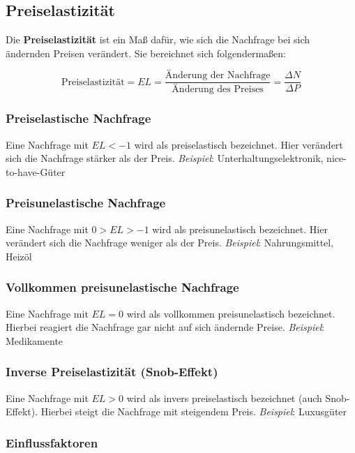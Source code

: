 \documentclass[titlepage,parskip=half]{scrartcl}
\begin{document}
\subsection{Preiselastizität}
Die \textbf{Preiselastizität} ist ein Maß dafür, wie sich die Nachfrage bei sich ändernden Preisen verändert. Sie bereichnet sich folgendermaßen:

$$
\textrm{Preiselastizität} = EL = \frac{\textrm{Änderung der Nachfrage}}{\textrm{Änderung des Preises}} = \frac{\Delta N}{\Delta P}
$$

\subsubsection{Preiselastische Nachfrage}
Eine Nachfrage mit $EL < -1$ wird als preiselastisch bezeichnet. Hier verändert sich die Nachfrage stärker als der Preis.\newline
\textit{Beispiel}: Unterhaltungselektronik, nice-to-have-Güter

\subsubsection{Preisunelastische Nachfrage}
Eine Nachfrage mit $0 > EL > -1$ wird als preisunelastisch bezeichnet. Hier verändert sich die Nachfrage weniger als der Preis.\newline
\textit{Beispiel}: Nahrungsmittel, Heizöl

\subsubsection{Vollkommen preisunelastische Nachfrage}
Eine Nachfrage mit $EL = 0$ wird als vollkommen preisunelastisch bezeichnet. Hierbei reagiert die Nachfrage gar nicht auf sich ändernde Preise.\newline
\textit{Beispiel}: Medikamente

\subsubsection{Inverse Preiselastizität (Snob-Effekt)}

Eine Nachfrage mit $EL > 0$ wird als invers preiselastisch bezeichnet (auch Snob-Effekt). Hierbei steigt die Nachfrage mit steigendem Preis.\newline
\textit{Beispiel}: Luxusgüter

\subsubsection{Einflussfaktoren}
\end{document}
